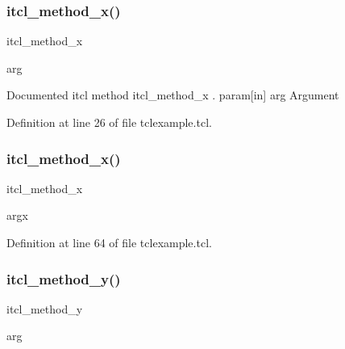 \subsubsection{\texorpdfstring{itcl\+\_\+method\+\_\+x()}{itcl\_method\_x()}\hspace{0.1cm}{\footnotesize\ttfamily [1/2]}}
{\footnotesize\ttfamily itcl\+\_\+method\+\_\+x\begin{DoxyParamCaption}\item[{}]{arg  }\end{DoxyParamCaption}}

Documented itcl method {\ttfamily itcl\+\_\+method\+\_\+x} . param\mbox{[}in\mbox{]} arg Argument 

Definition at line 26 of file tclexample.\+tcl.

\mbox{\label{classns_1_1itcl__class_af59b0413efa3edddf396f90765a7dbb0}} 
\subsubsection{\texorpdfstring{itcl\+\_\+method\+\_\+x()}{itcl\_method\_x()}\hspace{0.1cm}{\footnotesize\ttfamily [2/2]}}
{\footnotesize\ttfamily itcl\+\_\+method\+\_\+x\begin{DoxyParamCaption}\item[{}]{argx  }\end{DoxyParamCaption}}



Definition at line 64 of file tclexample.\+tcl.

\mbox{\label{classns_1_1itcl__class_aebc048061815775e39d37da80986eaad}} 
\subsubsection{\texorpdfstring{itcl\+\_\+method\+\_\+y()}{itcl\_method\_y()}}
{\footnotesize\ttfamily itcl\+\_\+method\+\_\+y\begin{DoxyParamCaption}\item[{}]{arg  }\end{DoxyParamCaption}}


